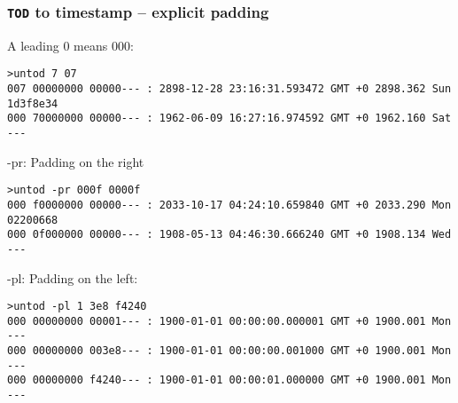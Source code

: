 \documentclass[10pt,xcolor=x11names]{beamer}
\newcommand{\tod}{\texttt{TOD}}
\begin{document}
\begin{frame}[fragile]
  \frametitle{\tod{} to timestamp -- explicit padding}
  \begin{block}{A leading 0 means 000:}

  \begin{lstlisting}
>untod 7 07
007 00000000 00000--- : 2898-12-28 23:16:31.593472 GMT +0 2898.362 Sun 1d3f8e34
000 70000000 00000--- : 1962-06-09 16:27:16.974592 GMT +0 1962.160 Sat ---
  \end{lstlisting}
  \end{block}
  \begin{block}{-pr: Padding on the right}

  \begin{lstlisting}
>untod -pr 000f 0000f
000 f0000000 00000--- : 2033-10-17 04:24:10.659840 GMT +0 2033.290 Mon 02200668
000 0f000000 00000--- : 1908-05-13 04:46:30.666240 GMT +0 1908.134 Wed ---
  \end{lstlisting}
  \end{block}

  \begin{block}{-pl: Padding on the left:}

  \begin{lstlisting}
>untod -pl 1 3e8 f4240
000 00000000 00001--- : 1900-01-01 00:00:00.000001 GMT +0 1900.001 Mon ---
000 00000000 003e8--- : 1900-01-01 00:00:00.001000 GMT +0 1900.001 Mon ---
000 00000000 f4240--- : 1900-01-01 00:00:01.000000 GMT +0 1900.001 Mon ---
  \end{lstlisting}
  \end{block}

\end{frame}
\end{document}
